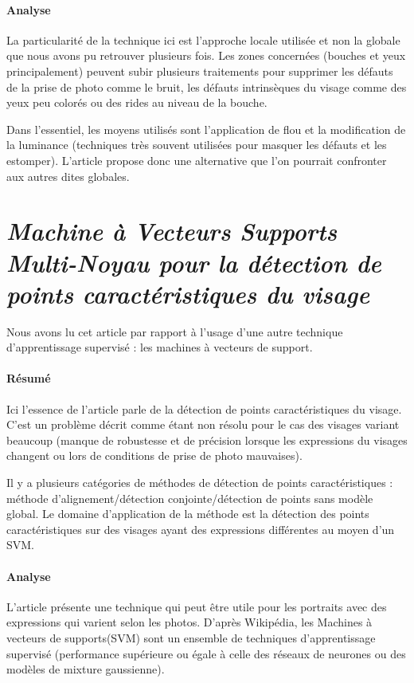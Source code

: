 \documentclass[11pt, french]{report-rd-info}
\begin{document}
\paragraph{Analyse}
La particularité de la technique ici est l’approche locale utilisée et non la globale que nous avons pu retrouver plusieurs fois. Les zones concernées (bouches et yeux principalement) peuvent subir plusieurs traitements pour supprimer les défauts de la prise de photo comme le bruit, les défauts intrinsèques du visage comme des yeux peu colorés ou des rides au niveau de la bouche. 

Dans l’essentiel, les moyens utilisés sont l’application de flou et la modification de la luminance (techniques très souvent utilisées pour masquer les défauts et les estomper). L’article propose donc une alternative que l’on pourrait confronter aux autres dites globales.

\section{\emph{Machine à Vecteurs Supports Multi-Noyau pour la détection de points caractéristiques du visage}}
Nous avons lu cet article \cite{Rapp2012} par rapport à l’usage d’une autre technique d’apprentissage supervisé : les machines à vecteurs de support.

\paragraph{Résumé}
Ici l'essence de l'article parle de la détection de points caractéristiques du visage.
C’est un problème décrit comme étant non résolu pour le cas des visages variant beaucoup (manque de robustesse et de précision lorsque les expressions du visages changent ou lors de conditions de prise de photo mauvaises).

Il y a plusieurs catégories de méthodes de détection de points caractéristiques :
méthode d'alignement/détection conjointe/détection de points sans modèle global.
Le domaine d'application de la méthode est la détection des points caractéristiques sur des visages ayant des expressions différentes au moyen d’un SVM.

\paragraph{Analyse}
L’article présente une technique qui peut être utile pour les portraits avec des expressions qui varient selon les photos. D’après Wikipédia, les Machines à vecteurs de supports(SVM) sont un ensemble de techniques d'apprentissage supervisé (performance supérieure ou égale à celle des réseaux de neurones ou des modèles de mixture gaussienne).
\end{document}
